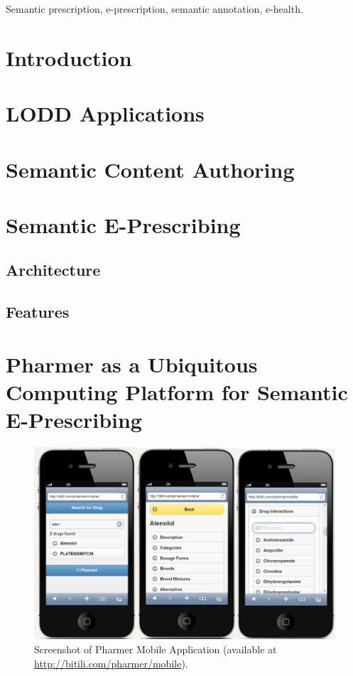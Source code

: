 \documentclass[journal]{IEEEtran}
\begin{document}
\begin{IEEEkeywords}
 Semantic prescription, e-prescription, semantic annotation, e-health.
\end{IEEEkeywords}



\IEEEpeerreviewmaketitle


\section{Introduction}
\label{intro}

\section{LODD Applications}
\label{lod}

\section{Semantic Content Authoring}
\label{sca}


\section{Semantic E-Prescribing}
\label{sep}

\subsection{Architecture}

\subsection{Features}

\section{Pharmer as a Ubiquitous Computing Platform for Semantic E-Prescribing}
\label{mobile}

\begin{figure}[tb]
 \centering
 \includegraphics[width=1.5\columnwidth]{images/sc_pharmer.png}
	\caption{Screenshot of Pharmer Mobile Application (available at \url{http://bitili.com/pharmer/mobile}).}
 \label{fig:mobile}
\end{figure}
\end{document}
